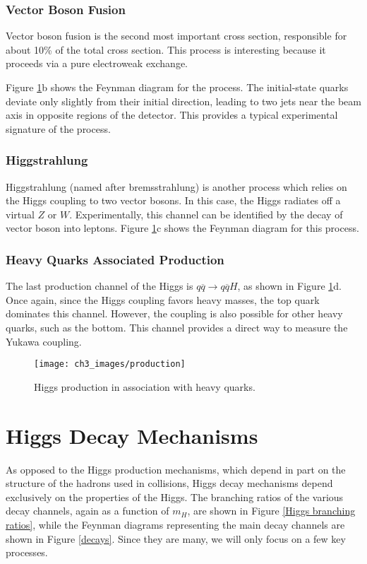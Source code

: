 \documentclass[10pt,a4paper]{book}
\begin{document}
\subsubsection{Vector Boson Fusion}
Vector boson fusion is the second most important cross section, responsible for about 10\% of the total cross section. This process is interesting because it proceeds via a pure electroweak exchange. 

Figure \ref{production}b shows the Feynman diagram for the process. The initial-state quarks deviate only slightly from their initial direction, leading to two jets near the beam axis in opposite regions of the detector. This provides a typical experimental signature of the process. 


\subsubsection{Higgstrahlung}
Higgstrahlung (named after bremsstrahlung) is another process which relies on the Higgs coupling to two vector bosons. In this case, the Higgs radiates off a virtual $Z$ or $W$. Experimentally, this channel can be identified by the decay of vector boson into leptons. Figure \ref{production}c shows the Feynman diagram for this process.


\subsubsection{Heavy Quarks Associated Production}
The last production channel of the Higgs is $q\overline{q}\rightarrow q\overline{q}H$, as shown in Figure \ref{production}d. Once again, since the Higgs coupling favors heavy masses, the top quark dominates this channel. However, the coupling is also possible for other heavy quarks, such as the bottom. This channel provides a direct way to measure the Yukawa coupling.

\begin{figure}
\centering
\texttt{[image: ch3\_images/production]}
\caption{Higgs production in association with heavy quarks.}
\label{production}
\end{figure}

\section{Higgs Decay Mechanisms}
As opposed to the Higgs production mechanisms, which depend in part on the structure of the hadrons used in collisions, Higgs decay mechanisms depend exclusively on the properties of the Higgs. The branching ratios of the various decay channels, again as a function of $m_H$, are shown in Figure \ref{Higgs branching ratios}, while the Feynman diagrams representing the main decay channels are shown in Figure \ref{decays}. Since they are many, we will only focus on a few key processes.
\end{document}
